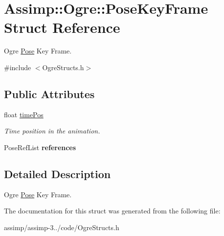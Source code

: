 \hypertarget{struct_assimp_1_1_ogre_1_1_pose_key_frame}{\section{Assimp\+:\+:Ogre\+:\+:Pose\+Key\+Frame Struct Reference}
\label{struct_assimp_1_1_ogre_1_1_pose_key_frame}
}


Ogre \hyperlink{class_assimp_1_1_ogre_1_1_pose}{Pose} Key Frame.  




{\ttfamily \#include $<$Ogre\+Structs.\+h$>$}

\subsection*{Public Attributes}
\begin{DoxyCompactItemize}
\item 
\hypertarget{struct_assimp_1_1_ogre_1_1_pose_key_frame_a0636424e2e9ff408f53e7697852ed61e}{float \hyperlink{struct_assimp_1_1_ogre_1_1_pose_key_frame_a0636424e2e9ff408f53e7697852ed61e}{time\+Pos}}\label{struct_assimp_1_1_ogre_1_1_pose_key_frame_a0636424e2e9ff408f53e7697852ed61e}

\begin{DoxyCompactList}\small\item\em Time position in the animation. \end{DoxyCompactList}\item 
\hypertarget{struct_assimp_1_1_ogre_1_1_pose_key_frame_a8d1764ebcc2ceafa06e9a68af58960f8}{Pose\+Ref\+List {\bfseries references}}\label{struct_assimp_1_1_ogre_1_1_pose_key_frame_a8d1764ebcc2ceafa06e9a68af58960f8}

\end{DoxyCompactItemize}


\subsection{Detailed Description}
Ogre \hyperlink{class_assimp_1_1_ogre_1_1_pose}{Pose} Key Frame. 

The documentation for this struct was generated from the following file\+:\begin{DoxyCompactItemize}
\item 
assimp/assimp-\/3../code/Ogre\+Structs.\+h\end{DoxyCompactItemize}
